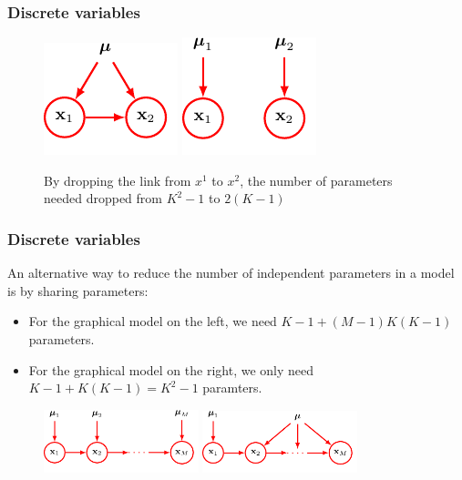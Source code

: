 \documentclass{beamer}
\begin{document}
\begin{frame}
    \frametitle{Discrete variables}
    \begin{figure}
        \caption{By dropping the link from $x^{1}$ to $x^{2}$, the number of parameters needed dropped from $K^{2}-1$ to $2(K-1)$}
        \includegraphics[trim=0 0 -1cm 0]{Figure_3_a.pdf}
        \includegraphics[trim=-1cm 0 0 0]{Figure_3_b.pdf}
    \end{figure}
\end{frame}

\begin{frame}
    \frametitle{Discrete variables}
    An alternative way to reduce the number of independent parameters in a model is by sharing parameters:
    \begin{itemize}
        \item For the graphical model on the left, we need $K-1+(M-1)K(K-1)$ parameters.
        \item For the graphical model on the right, we only need $K-1+K(K-1)=K^{2}-1$ paramters.
    \end{itemize}
    \begin{figure}
        \includegraphics[width=0.4\textwidth, trim=0 0 -1cm 0]{Figure_4.pdf}
        \includegraphics[width=0.4\textwidth, trim=-1cm 0 0 0]{Figure_5.pdf}
    \end{figure}
\end{frame}
\end{document}
